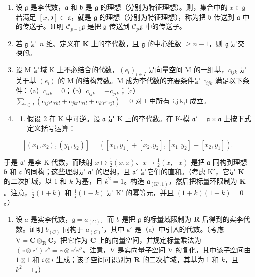 
\begin{enumerate}
\def\labelenumi{\arabic{enumi}.}
\item
  设 \(\mathfrak{g}\) 是李代数，\(\mathfrak{a}\) 和 \(\mathfrak{b}\) 是 \(\mathfrak{g}\) 的理想（分别为特征理想）。则，集合中的 \(x \in \mathfrak{g}\) 若满足 \([x, \mathfrak{b}] \subset \mathfrak{a}\)，就是 \(\mathfrak{g}\) 的理想（分别为特征理想），称为把 \(\mathfrak{b}\) 传送到 \(\mathfrak{a}\) 中的传送子。证明 \(\mathcal{C}_{p+1}\mathfrak{g}\) 是把 \(\mathfrak{g}\) 传送到 \(\mathcal{C}_p\mathfrak{g}\) 中的传送子。
\item
  若 \(\mathfrak{g}\) 是 \(n\) 维、定义在 \(\mathbf{K}\) 上的李代数，且 \(\mathfrak{g}\) 的中心维数 \(\geqslant n - 1\)，则 \(\mathfrak{g}\) 是交换的。
\item
  设 M 是域 K 上不必结合的代数，\((e_{i})_{i\in I}\) 是向量空间 M 的一组基，\(c_{ijk}\) 是关于基 \((e_{i})\) 的 M 的结构常数。M 成为李代数的充要条件是 \(c_{ijk}\) 满足以下条件：（a）\(c_{iik}=0\)；（b）\(c_{ijk}=-c_{jik}\)；（c）\(\sum_{r\in I}(c_{ijr}c_{rkl}+c_{jkr}c_{ril}+c_{kir}c_{rjl})=0\) 对 I 中所有 i,j,k,l 成立。
\item
  \begin{enumerate}
  \def\labelenumii{(\alph{enumii})}
  \tightlist
  \item
    假设 2 在 K 中可逆。设 \(\mathfrak{a}\) 是 K 上的李代数。在 K-模 \(\mathfrak{a}' = \mathfrak{a} \times \mathfrak{a}\) 上按下式定义括号运算：
  \end{enumerate}
\end{enumerate}

\[
[ (x _ {1}, x _ {2}), (y _ {1}, y _ {2}) ] = ([ x _ {1}, y _ {1} ] + [ x _ {2}, y _ {2} ], [ x _ {1}, y _ {2} ] + [ x _ {2}, y _ {1} ]).
\]

    于是 \(\mathfrak{a}'\) 是李 K-代数，而映射 \(x\mapsto \frac{1}{2} (x,x)\)、\(x\mapsto \frac{1}{2} (x, - x)\) 是把 \(\mathfrak{a}\) 同构到理想 \(\mathfrak{b}\) 和 \(\mathfrak{c}\) 的同构；这些理想是 \(\mathfrak{a}'\) 的理想，且 \(\mathfrak{a}'\) 是它们的直和。（考虑 \(\mathrm{K}'\)，它是 \(\mathbf{K}\) 的二次扩域，以 1 和 \(k\) 为基，且 \(k^2 = 1\)。构造 \(\mathfrak{a}_{(\mathrm{K}',1)}\)，然后把标量环限制为 \(\mathbf{K}\)。注意，\(\frac{1}{2} (1 + k)\) 和 \(\frac{1}{2}(1 - k)\) 是 \(\mathrm{K}'\) 的幂等元，并且 \((1 + k)(1 - k) = 0\)。）

\begin{enumerate}
\def\labelenumi{(\alph{enumi})}
\setcounter{enumi}{1}
\tightlist
\item
    设 \(a\) 是实李代数，\(\mathfrak{g} = a_{(C)}\)，而 \(b\) 是把 \(\mathfrak{g}\) 的标量域限制为 \(\mathbf{R}\) 后得到的实李代数。证明 \(b_{(C)}\) 同构于 \(a_{(C)}'\)，其中 \(a'\) 是（a）中引入的代数。（考虑 \(\mathrm{V} = \mathbf{C} \otimes_{\mathbf{R}} \mathbf{C}\)，把它作为 \(\mathbf{C}\) 上的向量空间，并规定标量乘法为 \((z \otimes z')z'' = z \otimes z'z''\)。注意，\(\mathrm{V}\) 是实向量子空间 \(\mathrm{V}\) 的复化，其中该子空间由 \(1 \otimes 1\) 和 \(i \otimes i\) 生成；该子空间可识别为 \(\mathbf{R}\) 的二次扩域，其基为 1 和 \(k\)，且 \(k^2 = 1\)。）
\end{enumerate}

